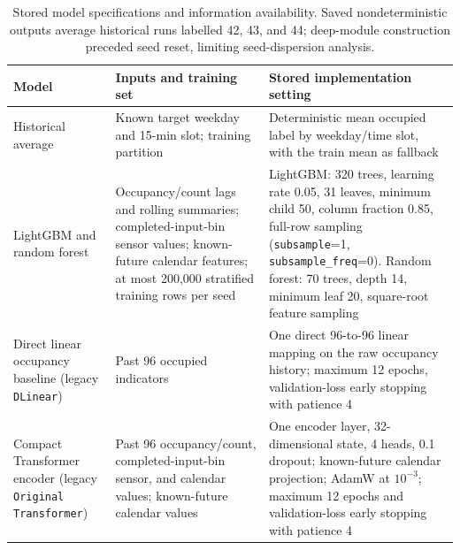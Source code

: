 \begin{table}[!t]
\caption{Stored model specifications and information availability. Saved nondeterministic outputs average historical runs labelled 42, 43, and 44; deep-module construction preceded seed reset, limiting seed-dispersion analysis.}
\label{tab:model-settings}
\centering
\footnotesize
\setlength{\tabcolsep}{3pt}
\begin{tabular}{p{}p{}p{}}
\toprule
Model & Inputs and training set & Stored implementation setting \\
\midrule
Historical average & Known target weekday and 15-min slot; training partition & Deterministic mean occupied label by weekday/time slot, with the train mean as fallback \\
LightGBM and random forest & Occupancy/count lags and rolling summaries; completed-input-bin sensor values; known-future calendar features; at most 200,000 stratified training rows per seed & LightGBM: 320 trees, learning rate 0.05, 31 leaves, minimum child 50, column fraction 0.85, full-row sampling (\texttt{subsample}=1, \texttt{subsample\_freq}=0). Random forest: 70 trees, depth 14, minimum leaf 20, square-root feature sampling \\
Direct linear occupancy baseline (legacy \texttt{DLinear}) & Past 96 occupied indicators & One direct 96-to-96 linear mapping on the raw occupancy history; maximum 12 epochs, validation-loss early stopping with patience 4 \\
Compact Transformer encoder (legacy \texttt{Original Transformer}) & Past 96 occupancy/count, completed-input-bin sensor, and calendar values; known-future calendar values & One encoder layer, 32-dimensional state, 4 heads, 0.1 dropout; known-future calendar projection; AdamW at $10^{-3}$; maximum 12 epochs and validation-loss early stopping with patience 4 \\
\bottomrule
\end{tabular}
\end{table}
